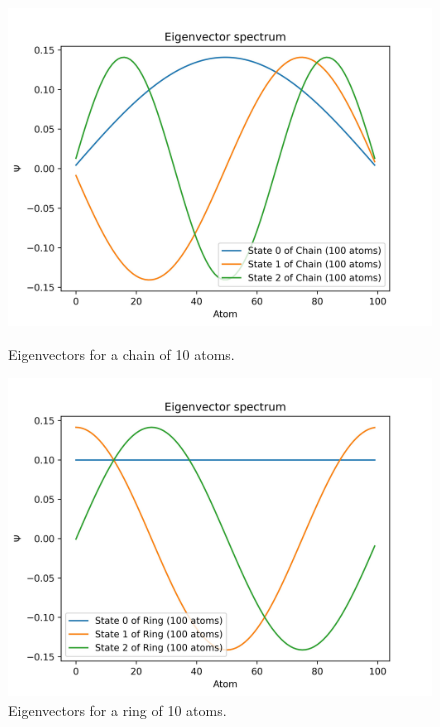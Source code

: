 \documentclass{article}
\begin{document}
\begin{figure}[ht]
    \centering
    \begin{minipage}{0.45\textwidth}
        \centering
        \includegraphics[width=\textwidth]{Figures/chain_eigenvectors.jpg}
        \caption{Eigenvectors for a chain of 10 atoms.}
        \label{fig:chain_eigenvectors}
    \end{minipage}
    \hfill
    \begin{minipage}{0.45\textwidth}
        \centering
        \includegraphics[width=\textwidth]{Figures/ring_eigenvectors.jpg}
        \caption{Eigenvectors for a ring of 10 atoms.}
        \label{fig:ring_eigenvectors}
    \end{minipage}
\end{figure}


\end{document}
